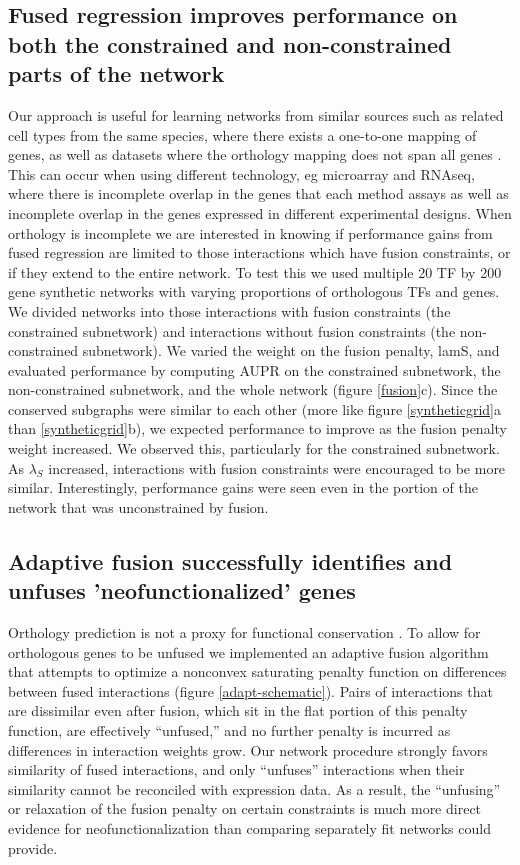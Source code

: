 \documentclass[11pt]{article}
\begin{document}
\subsection{Fused regression improves performance on both the constrained and non-constrained parts of the network}
Our approach is useful for learning networks from similar sources such as related cell types from the same species, where there exists a one-to-one mapping of genes, as well as datasets where the orthology mapping does not span all genes . 
This can occur when using different technology, eg microarray and RNAseq, where there is incomplete overlap in the genes that each method assays as well as incomplete overlap in the genes expressed in different experimental designs.  
When orthology is incomplete we are interested in knowing if performance gains from fused regression are limited to those interactions which have fusion constraints, or if they extend to the entire network. 
To test this we used multiple 20 TF by 200 gene synthetic networks with varying proportions of orthologous TFs and genes. 
We divided networks into those interactions with fusion constraints (the constrained subnetwork) and interactions without fusion constraints (the non-constrained subnetwork). 
We varied the weight on the fusion penalty, lamS, and evaluated performance by computing AUPR on the constrained subnetwork, the non-constrained subnetwork, and the whole network (figure \ref{fusion}c). 
Since the conserved subgraphs were similar to each other (more like figure \ref{syntheticgrid}a than \ref{syntheticgrid}b), we expected performance to improve as the fusion penalty weight increased. 
We observed this, particularly for the constrained subnetwork. 
As $\lambda_S$ increased, interactions with fusion constraints were encouraged to be more similar. 
Interestingly, performance gains were seen even in the portion of the network that was unconstrained by fusion. 

\subsection{Adaptive fusion successfully identifies and unfuses 'neofunctionalized' genes}
Orthology prediction is not a proxy for functional conservation \cite{gabaldon_functional_2013, studer_how_2009, nehrt_testing_2011}. 
To allow for orthologous genes to be unfused we implemented an adaptive fusion algorithm that attempts to optimize a nonconvex saturating penalty function on differences between fused interactions (figure \ref{adapt-schematic}). 
Pairs of interactions that are  dissimilar even after fusion, which sit in the flat portion of this penalty function, are effectively ``unfused,'' and no further penalty is incurred as differences in interaction weights grow. 
Our network procedure strongly favors similarity of fused interactions, and only ``unfuses'' interactions when their similarity cannot be reconciled with expression data. 
As a result, the ``unfusing'' or relaxation of the fusion penalty on certain constraints is much more direct evidence for neofunctionalization than comparing separately fit networks could provide. 
\end{document}

